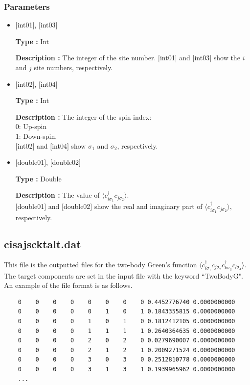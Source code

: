 \subsubsection{Parameters}
 \begin{itemize}

  \item  $[$int01$]$, $[$int03$]$

 {\bf Type :} Int

{\bf Description :} The integer of the site number. $[$int01$]$ and $[$int03$]$ show the $i$ and $j$ site numbers, respectively.
 
  \item  $[$int02$]$, $[$int04$]$

 {\bf Type :} Int 

{\bf Description :} The integer of the spin index:\\
   0: Up-spin\\
   1: Down-spin.\\ 
$[$int02$]$ and $[$int04$]$ show $\sigma_1$ and $\sigma_2$, respectively. \\

  \item  $[$double01$]$, $[$double02$]$

 {\bf Type :} Double 

{\bf Description :} The value of $\langle c_{i\sigma_1}^{\dagger}c_{j\sigma_2}\rangle$.\\
$[$double01$]$ and $[$double02$]$ show the real and imaginary part of $\langle c_{i\sigma_1}^{\dagger}c_{j\sigma_2}\rangle$, respectively.
\end{itemize}

\newpage
\subsection{cisajscktalt.dat}
\label{Subsec:cisajscktalt}
This file is the outputted files for the two-body Green's function $\langle c_{i\sigma_1}^{\dagger}c_{j\sigma_2}c_{k\sigma_3}^{\dagger}c_{l\sigma_4}\rangle$. 
The target components are set in the input file with the keyword ``TwoBodyG".
An example of the file format is as follows.

\begin{minipage}{15cm}
\begin{screen}
\begin{verbatim}
    0    0    0    0    0    0    0    0 0.4452776740 0.0000000000
    0    0    0    0    0    1    0    1 0.1843355815 0.0000000000
    0    0    0    0    1    0    1    0 0.1812412105 0.0000000000
    0    0    0    0    1    1    1    1 0.2640364635 0.0000000000
    0    0    0    0    2    0    2    0 0.0279690007 0.0000000000
    0    0    0    0    2    1    2    1 0.2009271524 0.0000000000
    0    0    0    0    3    0    3    0 0.2512810778 0.0000000000
    0    0    0    0    3    1    3    1 0.1939965962 0.0000000000
    ...
\end{verbatim}
\end{screen}
\end{minipage}

